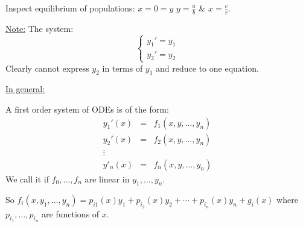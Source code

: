 \documentclass{article}
\newcommand{\tmtextbf}[1]{\text{{\bfseries{#1}}}}
\newcommand{\tmtextit}[1]{\text{{\itshape{#1}}}}
\begin{document}
\begin{enumerate}
  Inspect equilibrium of populations: $x = 0 = y$ \tmtextbf{or} $y =
  \frac{a}{b}$ \& $x = \frac{c}{r}$.
  
  {\underline{Note:}} The system:
  \[ \left\{\begin{array}{l}
       y_1' = y_1\\
       y_2' = y_2
     \end{array}\right. \]
  Clearly cannot express $y_2$ in terms of $y_1$ and reduce to one equation.
\end{enumerate}
{\underline{In general:}}

A first order system of ODEs is of the form:
\begin{eqnarray*}
  y_1' (x) & = & f_1 (x, y, \ldots, y_n)\\
  y_2' (x) & = & f_2 (x, y, \ldots, y_n)\\
  \vdots &  & \\
  y'_n (x) & = & f_n (x, y, \ldots, y_n)
\end{eqnarray*}
We call it \tmtextit{linear} if $f_0, \ldots, f_n$ are linear in $y_1, \ldots,
y_n$.

So $f_i (x, y_1, \ldots, y_n) = p_{i 1} (x) y_1 + p_{i_2} (x) y_2 + \cdots +
p_{i_n} (x) y_n + g_i (x)$ where $p_{i_1}, \ldots, p_{i_n}$ are functions of
$x$.
\end{document}
